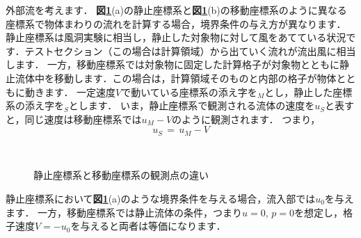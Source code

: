 外部流を考えます．
\textbf{図\ref{fig:reference_frame}}(a)の静止座標系と\textbf{図\ref{fig:reference_frame}}(b)の移動座標系のように異なる座標系で物体まわりの流れを計算する場合，境界条件の与え方が異なります．
静止座標系は風洞実験に相当し，静止した対象物に対して風をあてている状況です．テストセクション（この場合は計算領域）から出ていく流れが流出風に相当します．
一方，移動座標系では対象物に固定した計算格子が対象物とともに静止流体中を移動します．この場合は，計算領域そのものと内部の格子が物体とともに動きます．
一定速度$V$で動いている座標系の添え字を${}_M$とし，静止した座標系の添え字を${}_S$とします．
いま，静止座標系で観測される流体の速度を$u_{S}$と表すと，同じ速度は移動座標系では$u_{M}-V$のように観測されます．
つまり，
\begin{equation}
u_{S} \, = \, u_{M}-V
\label{eq:galilei}
\end{equation}

\begin{figure}[htbp]
\begin{center}
~
\caption{静止座標系と移動座標系の観測点の違い} 
\label{fig:reference_frame}
\end{center}
\end{figure}

静止座標系において\textbf{図\ref{fig:reference_frame}}(a)のような境界条件を与える場合，流入部では$u_{0}$を与えます．
一方，移動座標系では静止流体の条件，つまり$u=0,\,p=0$を想定し，格子速度$V=-u_{0}$を与えると両者は等価になります．

